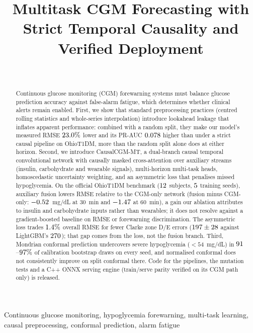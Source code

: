 \documentclass[pmlr,twocolumn,10pt]{jmlr}
\title[Multitask CGM Forecasting]{Multitask CGM Forecasting with Strict
  Temporal Causality and Verified Deployment}
\author{\Name{Christopher Alexander Perez} \Email{chris\_perez@stanford.edu}\\
  \addr{Independent Researcher}}
\begin{document}
\maketitle

\begin{abstract}
Continuous glucose monitoring (CGM) forewarning systems must balance glucose
prediction accuracy against false-alarm fatigue, which determines whether
clinical alerts remain enabled. First, we show
that standard preprocessing practices (centred rolling statistics and
whole-series interpolation) introduce lookahead leakage that inflates apparent
performance: combined with a random split, they make our model's measured RMSE
$23.0\%$ lower and its PR-AUC
$0.078$ higher than under a strict causal pipeline on
OhioT1DM, more than the random split alone does at either horizon. Second, we introduce CausalCGM-MT, a dual-branch causal temporal
convolutional network with causally masked cross-attention over auxiliary
streams (insulin, carbohydrate and wearable signals), multi-horizon multi-task
heads, homoscedastic uncertainty weighting, and an asymmetric loss that
penalises missed hypoglycemia. On the official OhioT1DM benchmark
($12$ subjects, $5$ training seeds), auxiliary fusion lowers
RMSE relative to the CGM-only network (fusion minus CGM-only:
$-0.52$~mg/dL at 30~min and $-1.47$
at 60~min), a gain our ablation
attributes to insulin and carbohydrate inputs rather than wearables; it does
not resolve against a gradient-boosted baseline on RMSE or forewarning
discrimination. The asymmetric loss trades $1.4\%$ overall
RMSE for fewer Clarke zone D/E errors ($197 \pm
28$ against LightGBM's $270$); that gap
comes from the loss, not the fusion branch. Third, Mondrian conformal prediction
undercovers severe hypoglycemia ($<54$~mg/dL) in
$91$--$97\%$ of calibration
bootstrap draws on every seed, and normalised conformal does not consistently
improve on split conformal there. Code for the pipelines, the mutation tests
and a C++ ONNX serving engine (train/serve parity verified on its CGM path only) is released.
\end{abstract}

\begin{keywords}
Continuous glucose monitoring, hypoglycemia forewarning, multi-task learning,
causal preprocessing, conformal prediction, alarm fatigue
\end{keywords}
\end{document}
